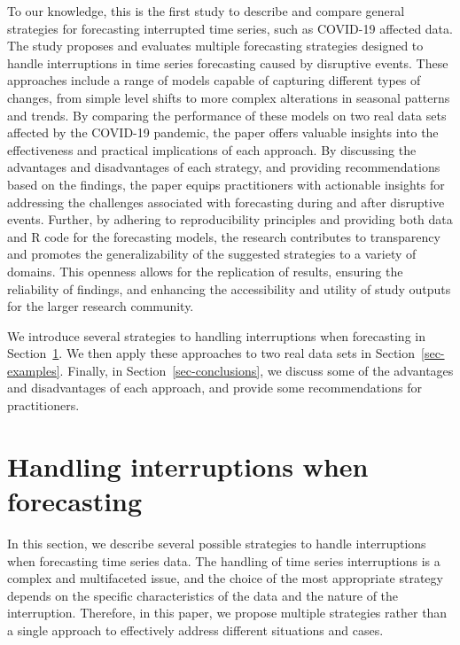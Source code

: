 \documentclass[
  11pt,
  a4paper,
]{article}
\begin{document}
To our knowledge, this is the first study to describe and compare
general strategies for forecasting interrupted time series, such as
COVID-19 affected data. The study proposes and evaluates multiple
forecasting strategies designed to handle interruptions in time series
forecasting caused by disruptive events. These approaches include a
range of models capable of capturing different types of changes, from
simple level shifts to more complex alterations in seasonal patterns and
trends. By comparing the performance of these models on two real data
sets affected by the COVID-19 pandemic, the paper offers valuable
insights into the effectiveness and practical implications of each
approach. By discussing the advantages and disadvantages of each
strategy, and providing recommendations based on the findings, the paper
equips practitioners with actionable insights for addressing the
challenges associated with forecasting during and after disruptive
events. Further, by adhering to reproducibility principles and providing
both data and R code for the forecasting models, the research
contributes to transparency and promotes the generalizability of the
suggested strategies to a variety of domains. This openness allows for
the replication of results, ensuring the reliability of findings, and
enhancing the accessibility and utility of study outputs for the larger
research community.

We introduce several strategies to handling interruptions when
forecasting in Section~\ref{sec-methods}. We then apply these approaches
to two real data sets in Section~\ref{sec-examples}. Finally, in
Section~\ref{sec-conclusions}, we discuss some of the advantages and
disadvantages of each approach, and provide some recommendations for
practitioners.

\section{Handling interruptions when forecasting}\label{sec-methods}

In this section, we describe several possible strategies to handle
interruptions when forecasting time series data. The handling of time
series interruptions is a complex and multifaceted issue, and the choice
of the most appropriate strategy depends on the specific characteristics
of the data and the nature of the interruption. Therefore, in this
paper, we propose multiple strategies rather than a single approach to
effectively address different situations and cases.
\end{document}
